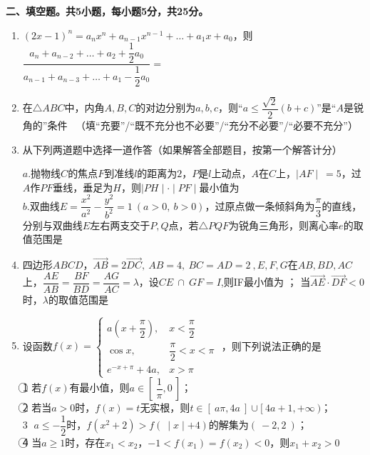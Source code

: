 \documentclass[11pt,a4paper]{ctexart}
\newcommand{\sectiontitle}[1]{
  \par\noindent\textbf{#1}\par%
  }
\begin{document}
\newpage
\sectiontitle{二、填空题。共5小题，每小题5分，共25分。}
\begin{enumerate}[start=11] %

    \item$(2x-1)^n=a_nx^n+a_{n-1}x^{n-1}+ \ldots +a_1x+a_0$，则$\dfrac{a_n+a_{n-2}+ \ldots +a_2 +\dfrac{1}{2}a_0}{a_{n-1}+a_{n-3}+ \ldots +a_1 -\dfrac{1}{2}a_0}=$
    \underline{\hspace{2cm}}

    \item 在$\triangle ABC$中，内角$A,B,C$的对边分别为$a,b,c$，则“$a \le \dfrac{\sqrt{2}}{2}(b+c)$”是“$A$是锐角的”\underline{\hspace{2cm}}条件 \ （填“充要”/“既不充分也不必要”/“充分不必要”/“必要不充分”）

    \item 从下列两道题中选择一道作答（如果解答全部题目，按第一个解答计分）
    
    $a$.抛物线$C$的焦点$F$到准线$l$的距离为$2$，$P$是$l$上动点，$A$在$C$上，$\mid AF\mid \ =5$，过$A$作$PF$垂线，垂足为$H$，则$ \mid PH \mid \cdot \mid PF \mid$最小值为
    \underline{\hspace{2cm}}\\
    $b$.双曲线$E=\dfrac{x^2}{a^2}-\dfrac{y^2}{b^2}=1\ (a>0,\ b>0)$，过原点做一条倾斜角为$\dfrac{\pi}{3}$的直线，分别与双曲线$E$左右两支交于$P,Q$点，若$\triangle PQF$为锐角三角形，则离心率$e$的取值范围是\underline{\hspace{2cm}}

    \item 四边形$ABCD$，$\overrightarrow{AB}=2\overrightarrow{DC},\ AB=4,\ BC=AD=2\ ,E,F,G$在$AB,BD,AC$上，$\dfrac{AE}{AB}=\dfrac{BF}{BD}=\dfrac{AG}{AC}=\lambda$，设$CE \ \cap \ GF=I $,则IF最小值为 
    \underline{\hspace{2cm}}；
    当$\overrightarrow{AE} \cdot \overrightarrow{DF}<0$时，$\lambda$的取值范围是\underline{\hspace{2cm}}

    \item 设函数$f(x) =
        \begin{cases}
        a(x+\dfrac{\pi}{2}), & x <\dfrac{\pi}{2} \\
        \cos x, & \dfrac{\pi}{2}<x < \pi \\
        e^{-x+\pi}+4a, &x>\pi
        \end{cases}$
        ，则下列说法正确的是
        \underline{\hspace{2cm}}\\[1em]
    \textcircled{1}  若$f(x)$有最小值，则$a \in [\ \dfrac{1}{\pi},0\ ]$；\\
    \textcircled {2} 若当$a>0$时，$f(x)=t$无实根，则$t \in [\ a\pi,4a\ ]\cup[\ 4a+1,+\infty\ )$；\\
    \textcircled {3} $a \le -\dfrac{1}{2}$时，$f(x^2+2)>f(\ \mid x \mid +4)$的解集为$(\ -2,2\ )$；\\
    \textcircled {4} 当$a \ge 1$时，存在$x_1<x_2$，$-1<f(x_1)=f(x_2)<0$，则$x_1+x_2>0$ 
    
\end{enumerate}
\end{document}
